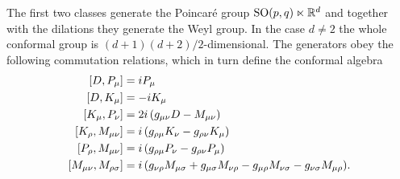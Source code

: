 The first two classes generate the Poincar\'{e} group
$\textrm{SO}(p,q)\ltimes\mathbb{R}^d$ and together with the dilations
they generate the Weyl group. In the case $d\neq 2$ the whole
conformal group is $(d+1)(d+2)/2$-dimensional. The generators
obey the following commutation relations, which in turn define 
the conformal algebra \cite*{dFMS:1997}
 \begin{equation}
  \begin{split}
  \comm{D,P_{\mu}}&=i P_{\mu}\\
  \comm{D,K_{\mu}}&=-i K_{\mu}\\
  \comm{K_{\mu},P_{\nu}}&=2i\,(g_{\mu \nu}D-M_{\mu \nu})\\
  \comm{K_{\rho},M_{\mu \nu}}&=i\,(g_{\rho \mu} K_{\nu} -
                              g_{\rho \nu}K_{\mu})\\
  \comm{P_{\rho}, M_{\mu \nu}}&=i\,(g_{\rho \mu} P_{\nu} -
                              g_{\rho \nu}P_{\mu})\\
  \comm{M_{\mu \nu},M_{\rho \sigma}}&=i\, (g_{\nu \rho}M_{\mu \sigma}
                              +g_{\mu \sigma}M_{\nu \rho}-
                              g_{\mu \rho}M_{\nu \sigma}-
                              g_{\nu \sigma}M_{\mu \rho}).
  \end{split}
 \end{equation}




